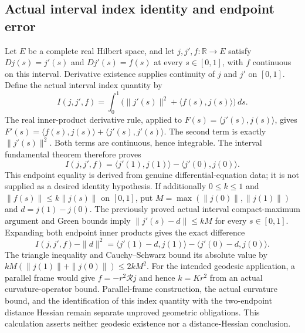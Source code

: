 \documentclass[11pt]{article}
\theoremstyle{definition}
\theoremstyle{remark}
\numberwithin{equation}{section}
\begin{document}
\subsection{Actual interval index identity and endpoint error}
\label{expanded:jacobi-index-identity}
Let $E$ be a complete real Hilbert space, and let $j,j',f:\mathbb R\to E$
satisfy $D j(s)=j'(s)$ and $D j'(s)=f(s)$ at every $s\in[0,1]$,
with $f$ continuous on this interval. Derivative existence supplies
continuity of $j$ and $j'$ on $[0,1]$. Define the actual interval index
quantity by
\[
 I(j,j',f)=\int_0^1\bigl(\|j'(s)\|^2+\langle f(s),j(s)\rangle\bigr)\,ds.
\]
The real inner-product derivative rule, applied to
$F(s)=\langle j'(s),j(s)\rangle$, gives
$F'(s)=\langle f(s),j(s)\rangle+\langle j'(s),j'(s)\rangle$.
The second term is exactly $\|j'(s)\|^2$. Both terms are continuous,
hence integrable. The interval fundamental theorem therefore proves
\[
 I(j,j',f)=\langle j'(1),j(1)\rangle-\langle j'(0),j(0)\rangle.
\]
This endpoint equality is derived from genuine differential-equation data;
it is not supplied as a desired identity hypothesis.
\label{expanded:jacobi-index-error}
If additionally $0\le k\le1$ and $\|f(s)\|\le k\|j(s)\|$ on $[0,1]$,
put $M=\max(\|j(0)\|,\|j(1)\|)$ and $d=j(1)-j(0)$.
The previously proved actual interval compact-maximum argument and Green
bounds imply $\|j'(s)-d\|\le kM$ for every $s\in[0,1]$.
Expanding both endpoint inner products gives the exact difference
\[
 I(j,j',f)-\|d\|^2
 =\langle j'(1)-d,j(1)\rangle-\langle j'(0)-d,j(0)\rangle.
\]
The triangle inequality and Cauchy--Schwarz bound its absolute value by
$kM(\|j(1)\|+\|j(0)\|)\le2kM^2$.
For the intended geodesic application, a parallel frame would give
$f=-r^2\mathcal Rj$ and hence $k=Kr^2$ from an actual curvature-operator
bound. Parallel-frame construction, the actual curvature bound, and the
identification of this index quantity with the two-endpoint distance Hessian
remain separate unproved geometric obligations. This calculation asserts
neither geodesic existence nor a distance-Hessian conclusion.
\end{document}
